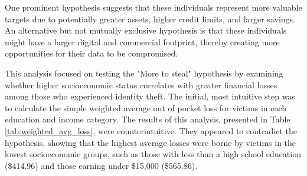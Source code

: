 One prominent hypothesis suggests that these individuals represent more valuable targets due to potentially greater assets, higher credit limits, and larger savings. An alternative but not mutually exclusive hypothesis is that these individuals might have a larger digital and commercial footprint, thereby creating more opportunities for their data to be compromised. 

This analysis focused on testing the "More to steal" hypothesis by examining whether higher socioeconomic status correlates with greater financial losses among those who experienced identity theft. The initial, most intuitive step was to calculate the simple weighted average out of pocket loss for victims in each education and income category. The results of this analysis, presented in Table \ref{tab:weighted_avg_loss}, were counterintuitive. They appeared to contradict the hypothesis, showing that the highest average losses were borne by victims in the lowest socioeconomic groups, such as those with less than a high school education (\$414.96) and those earning under \$15,000 (\$565.86).

